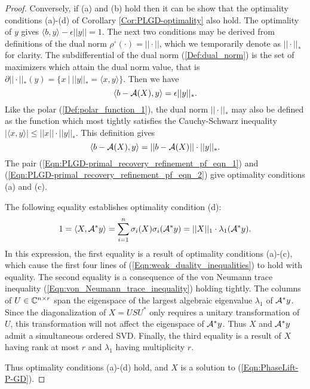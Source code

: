 \begin{enumerate}
\begin{proof}
Conversely, if (a) and (b) hold then it can be show that the optimality conditions (a)-(d) of Corollary \ref{Cor:PLGD-optimality} also hold.  The optimality of $y$ gives $\langle b, y \rangle - \epsilon ||y|| = 1$.  The next two conditions may be derived from definitions of the dual norm $\rho^\circ(\cdot) = ||\cdot||$, which we temporarily denote as $||\cdot||_*$ for clarity. The subdifferential of the dual norm (\ref{Def:dual_norm}) is the set of maximizers which attain the dual norm value, that is $\partial || \cdot ||_* (y) = \{ x \ | \ ||y||_* = \langle x,y \rangle \}$.  Then we have
\begin{equation}			\label{Eqn:PLGD-primal_recovery_refinement_pf_eqn_1}
\langle b - {\mathcal A}(X), y \rangle = \epsilon ||y||_*.
\end{equation}
Like the polar (\ref{Def:polar_function_1}), the dual norm $||\cdot||_*$ may also be defined as the function which most tightly satisfies the Cauchy-Schwarz inequality $|\langle x, y \rangle| \leq ||x|| \cdot ||y||_*$.  This definition gives
\begin{equation}			\label{Eqn:PLGD-primal_recovery_refinement_pf_eqn_2}
\langle b - {\mathcal A}(X), y \rangle = ||b-{\mathcal A}(X)|| \cdot ||y||_*.
\end{equation} 
The pair (\ref{Eqn:PLGD-primal_recovery_refinement_pf_eqn_1}) and (\ref{Eqn:PLGD-primal_recovery_refinement_pf_eqn_2}) give optimality conditions (a) and (c).

The following equality establishes optimality condition (d):
\[
1 = \langle X, {\mathcal A}^*y \rangle = \sum_{i=1}^n \sigma_i(X) \sigma_i({\mathcal A}^*y) = ||X||_1 \cdot \lambda_1({\mathcal A}^*y).
\]
In this expression, the first equality is a result of optimality conditions (a)-(c), which cause the first four lines of (\ref{Eqn:weak_duality_inequalities}) to hold with equality.  The second equality is a consequence of the von Neumann trace inequality (\ref{Eqn:von_Neumann_trace_inequality}) holding tightly.  The columns of $U \in {\mathbb C}^{n \times r}$ span the eigenspace of the largest algebraic eigenvalue $\lambda_1$ of ${\mathcal A}^*y$.  Since the diagonalization of $X = USU^*$ only requires a unitary transformation of $U$, this transformation will not affect the eigenspace of ${\mathcal A}^*y$.  Thus $X$ and ${\mathcal A}^*y$ admit a simultaneous ordered SVD.  Finally, the third equality is a result of $X$ having rank at most $r$ and $\lambda_1$ having multiplicity $r$.

Thus optimality conditions (a)-(d) hold, and  $X$ is a solution to (\ref{Eqn:PhaseLift-P-GD}).



\end{proof}
\end{enumerate}
